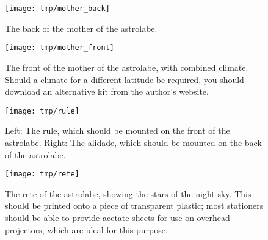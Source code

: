 \documentclass[a4paper,onecolumn,10pt]{article}
\begin{document}
\newpage

\begin{figure}
\centerline{\texttt{[image: tmp/mother\_back]}}
\caption{The back of the mother of the astrolabe.}
\label{mother_back}
\end{figure}

\begin{figure}
\centerline{\texttt{[image: tmp/mother\_front]}}
\caption{The front of the mother of the astrolabe, with combined climate. Should a climate for a different latitude be required, you should download an alternative kit from the author's website.}
\label{mother_front}
\end{figure}

\begin{figure}
\centerline{\texttt{[image: tmp/rule]}}
\caption{Left: The rule, which should be mounted on the front of the astrolabe. Right: The alidade, which should be mounted on the back of the astrolabe.}
\label{rule}
\end{figure}

\begin{figure}
\centerline{\texttt{[image: tmp/rete]}}
\caption{The rete of the astrolabe, showing the stars of the night sky. This should be printed onto a piece of transparent plastic; most stationers should be able to provide acetate sheets for use on overhead projectors, which are ideal for this purpose.}
\label{rete}
\end{figure}
\end{document}
